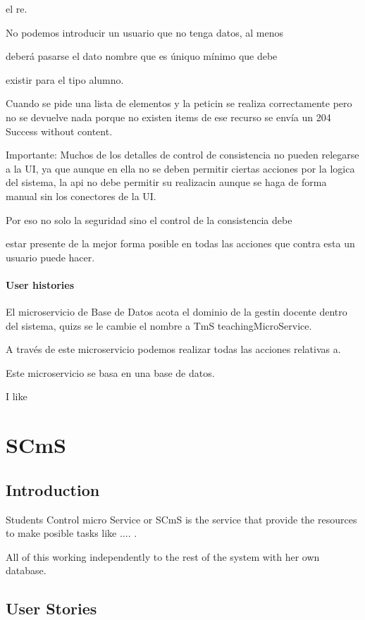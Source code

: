 \documentclass[oneside,english,titlepage]{scrbook}
\begin{document}
el re.

No podemos introducir un usuario que no tenga datos, al menos

deberá pasarse el dato nombre que es úniquo mínimo que debe

existir para el tipo alumno.

Cuando se pide una lista de elementos y la peticin se realiza correctamente
pero no se devuelve nada porque no existen items de ese recurso se
envía un 204 Success without content.

Importante: Muchos de los detalles de control de consistencia no pueden
relegarse a la UI, ya que aunque en ella no se deben permitir ciertas
acciones por la logica del sistema, la api no debe permitir su realizacin
aunque se haga de forma manual sin los conectores de la UI.

Por eso no solo la seguridad sino el control de la consistencia debe

estar presente de la mejor forma posible en todas las acciones que
contra esta un usuario puede hacer.

\paragraph{User histories}

El microservicio de Base de Datos acota el dominio de la gestin docente
dentro del sistema, quizs se le cambie el nombre a TmS teachingMicroService.

A través de este microservicio podemos realizar todas las acciones
relativas a.

Este microservicio se basa en una base de datos.

I like

\section{SCmS}

\subsection{Introduction}

Students Control micro Service or SCmS is the service that provide
the resources to make posible tasks like .... .

All of this working independently to the rest of the system with her
own database.

\subsection{User Stories}
\end{document}
